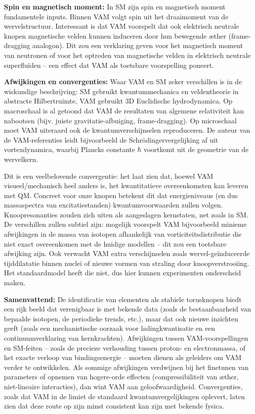 \textbf{Spin en magnetisch moment:} In SM zijn spin en magnetisch moment fundamentele inputs. Binnen VAM volgt spin uit het draaimoment van de wervelstructuur. Interessant is dat VAM voorspelt dat ook elektrisch neutrale knopen magnetische velden kunnen induceren door hun bewegende æther (frame-dragging analogon). Dit zou een verklaring geven voor het magnetisch moment van neutronen of voor het optreden van magnetische velden in elektrisch neutrale superfluïden – een effect dat VAM als toetsbare voorspelling poneert.

\textbf{Afwijkingen en convergenties:} Waar VAM en SM zeker verschillen is in de wiskundige beschrijving: SM gebruikt kwantummechanica en veldentheorie in abstracte Hilbertruimte, VAM gebruikt 3D Euclidische hydrodynamica. Op macroschaal is al getoond dat VAM de resultaten van algemene relativiteit kan nabootsen (bijv. juiste gravitatie-afbuiging, frame-dragging). Op microschaal moet VAM uiteraard ook de kwantumverschijnselen reproduceren. De auteur van de VAM-referenties leidt bijvoorbeeld de Schrödingervergelijking af uit vortexdynamica, waarbij Plancks constante $\hbar$ voortkomt uit de geometrie van de wervelkern.

Dit is een veelbelovende convergentie: het laat zien dat, hoewel VAM visueel/mechanisch heel anders is, het kwantitatieve overeenkomsten kan leveren met QM. Concreet voor onze knopen betekent dit dat energieniveaus (en dus massaspectra van excitatiestanden) kwantumvoorwaarden zullen volgen. Knoopresonanties zouden zich uiten als aangeslagen kernstaten, net zoals in SM. De verschillen zullen subtiel zijn: mogelijk voorspelt VAM bijvoorbeeld minieme afwijkingen in de massa van isotopen afhankelijk van vorticiteitsdistributie die niet exact overeenkomen met de huidige modellen – dit zou een toetsbare afwijking zijn. Ook verwacht VAM extra verschijnselen zoals wervel-geïnduceerde tijddilatatie binnen nuclei of nieuwe vormen van straling door knoopverstrooiing. Het standaardmodel heeft die niet, dus hier kunnen experimenten onderscheid maken.

\textbf{Samenvattend:} De identificatie van elementen als stabiele torusknopen biedt een rijk beeld dat verenigbaar is met bekende data (zoals de bestaanbaarheid van bepaalde isotopen, de periodieke trends, etc.), maar dat ook nieuwe inzichten geeft (zoals een mechanistische oorzaak voor ladingkwantisatie en een continuumverklaring van kernkrachten). Afwijkingen tussen VAM-voorspellingen en SM-feiten – zoals de precieze verhouding tussen proton- en electronmassa, of het exacte verloop van bindingsenergie – moeten dienen als geleiders om VAM verder te ontwikkelen. Als sommige afwijkingen verdwijnen bij het finetunen van parameters of opnemen van hogere-orde effecten (compressibiliteit van æther, niet-lineaire interacties), dan wint VAM aan geloofwaardigheid. Convergenties, zoals dat VAM in de limiet de standaard kwantumvergelijkingen oplevert, laten zien dat deze route op zijn minst consistent kan zijn met bekende fysica.